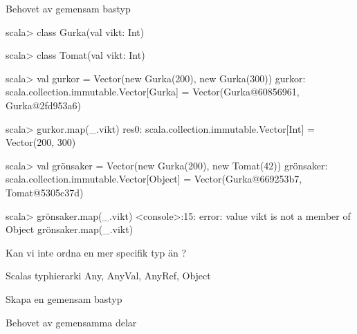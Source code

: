 \begin{Slide}{Behovet av gemensam bastyp}
\begin{REPL}
scala> class Gurka(val vikt: Int)

scala> class Tomat(val vikt: Int)

scala> val gurkor = Vector(new Gurka(200), new Gurka(300))
gurkor: scala.collection.immutable.Vector[Gurka] = 
  Vector(Gurka@60856961, Gurka@2fd953a6)
  
scala> gurkor.map(_.vikt)
res0: scala.collection.immutable.Vector[Int] = Vector(200, 300)

scala> val grönsaker = Vector(new Gurka(200), new Tomat(42))
grönsaker: scala.collection.immutable.Vector[Object] = 
  Vector(Gurka@669253b7, Tomat@5305c37d)

scala> grönsaker.map(_.vikt)
<console>:15: error: value vikt is not a member of Object
       grönsaker.map(_.vikt)
\end{REPL}
Kan vi inte ordna en mer specifik typ än ?
\end{Slide}


\begin{Slide}{Scalas typhierarki}
Any, AnyVal, AnyRef, Object
\end{Slide}


\begin{Slide}{Skapa en gemensam bastyp}
\end{Slide}

\begin{Slide}{Behovet av gemensamma delar}
\end{Slide}



\fi